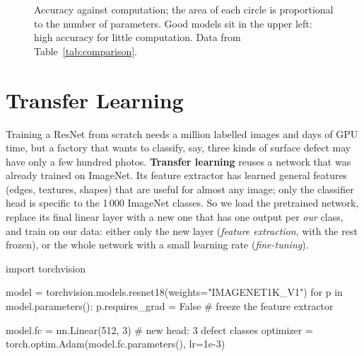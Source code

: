 \documentclass[12pt, a4paper]{article}
\begin{document}
\begin{figure}[H]
  \caption{Accuracy against computation; the area of each circle is
    proportional to the number of parameters. Good models sit in the upper
    left: high accuracy for little computation. Data from
    Table~\ref{tab:comparison}.}
  \label{fig:bubble}
\end{figure}

\section{Transfer Learning}
\label{sec:transfer}

Training a ResNet from scratch needs a million labelled images and days of
GPU time, but a factory that wants to classify, say, three kinds of surface
defect may have only a few hundred photos. \textbf{Transfer learning} reuses a
network that was already trained on ImageNet. Its feature extractor has
learned general features (edges, textures, shapes) that are useful for almost
any image; only the classifier head is specific to the 1\,000 ImageNet
classes. So we load the pretrained network, replace its final linear layer
with a new one that has one output per \emph{our} class, and train on our
data: either only the new layer (\emph{feature extraction}, with the rest
frozen), or the whole network with a small learning rate
(\emph{fine-tuning}).

\begin{codebox}
import torchvision

model = torchvision.models.resnet18(weights="IMAGENET1K_V1")
for p in model.parameters():
    p.requires_grad = False              # freeze the feature extractor

model.fc = nn.Linear(512, 3)             # new head: 3 defect classes
optimizer = torch.optim.Adam(model.fc.parameters(), lr=1e-3)
\end{codebox}
\end{document}
